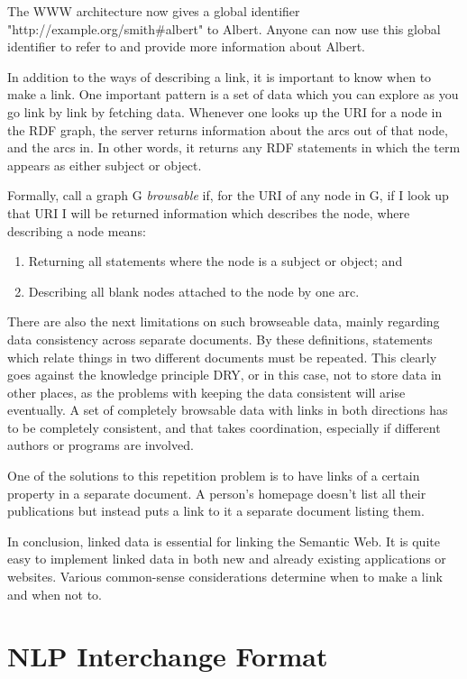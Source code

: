 \documentclass[thesis=M,english,hidelinks]{FITthesis}[2019/12/23]
\begin{document}
The \gls{WWW} architecture now gives a global identifier  "http://example.org/smith\#albert" to Albert. Anyone can now use this global identifier to refer to and provide more information about Albert.

In addition to the ways of describing a link, it is important to know when to make a link. One important pattern is a set of data which you can explore as you go link by link by fetching data.   Whenever one looks up the \gls{URI} for a node in the RDF graph, the server returns information about the arcs out of that node, and the arcs in.  In other words, it returns any RDF statements in which the term appears as either subject or object.

Formally, call a graph G \textit{browsable} if, for  the \gls{URI} of any node in G, if I look up that \gls{URI} I will be returned information which describes the node, where describing a node means:
\begin{enumerate}
	\item Returning all statements where the node is a subject or object; and
	\item Describing all blank nodes attached to the node by one arc.
\end{enumerate}

There are also the next limitations on such browseable data, mainly regarding data consistency across separate documents. By these definitions, statements which relate things in two different documents must be repeated. This clearly goes against the knowledge principle \gls{DRY}, or in this case, not to store data in other places, as the problems with keeping the data consistent will arise eventually. A set of completely browsable data with links in both directions has to be completely consistent, and that takes coordination, especially if different authors or programs are involved.

One of the solutions to this repetition problem is to have links of a certain property in a separate document.   A person's homepage doesn't list all their publications but instead puts a link to it a separate document listing them.

In conclusion, linked data is essential for linking the Semantic Web. It is quite easy to implement linked data in both new and already existing applications or websites. Various common-sense considerations determine when to make a link and when not to.

\section{NLP Interchange Format}
\end{document}
